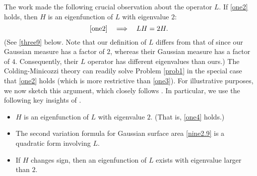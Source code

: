 \documentclass[12pt,reqno]{amsart}
\theoremstyle{definition}
\begin{document}
The work \cite{colding12a} made the following crucial observation about the operator $L$.  If \eqref{one2} holds, then $H$ is an eigenfunction of $L$ with eigenvalue $2$:
\begin{equation}\label{one4}
\eqref{one2}\quad\Longrightarrow\quad LH=2H.
\end{equation}
(See \eqref{three9} below.  Note that our definition of $L$ differs from that of \cite{colding12a} since our Gaussian measure has a factor of $2$, whereas their Gaussian measure has a factor of $4$.  Consequently, their $L$ operator has different eigenvalues than ours.)  The Colding-Minicozzi theory can readily solve Problem \ref{prob1} in the special case that \eqref{one2} holds (which is more restrictive than \eqref{one3}).  For illustrative purposes, we now sketch this argument, which closely follows \cite[Theorem 4.30]{colding12a}.  In particular, we use the following key insights of \cite{colding12a}.

\begin{itemize}
\item $H$ is an eigenfunction of $L$ with eigenvalue $2$.  (That is, \eqref{one4} holds.)
\item The second variation formula for Gaussian surface area \eqref{nine2.9} is a quadratic form involving $L$.
\item If $H$ changes sign, then an eigenfunction of $L$ exists with eigenvalue larger than $2$.
\end{itemize}
\end{document}
